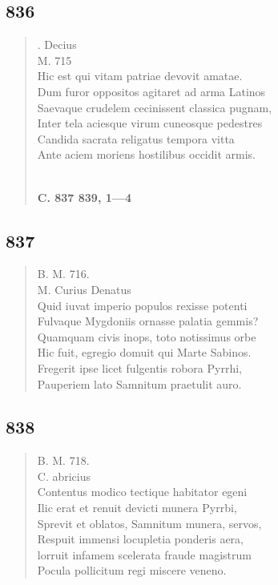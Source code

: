 \documentclass[11pt, a4paper]{report}
\begin{document}
            \subsection*{836}
      \begin{verse}
      . Decius \\ M. 715 \\ Hic est qui vitam patriae devovit amatae. \\ Dum furor oppositos agitaret ad arma Latinos \\ Saevaque crudelem cecinissent classica pugnam, \\ Inter tela aciesque virum cuneosque pedestres \\ Candida sacrata religatus tempora vitta \\ Ante aciem moriens hostilibus occidit armis. \\ 
        ﻿\pagebreak 
     \marginpar{[303]} \begin{center} \textbf{C. 837 839, 1—4} \end{center}
      \end{verse}
  
            \subsection*{837}
      \begin{verse}
      B. M. 716. \\ M. Curius Denatus \\ Quid iuvat imperio populos rexisse potenti \\ Fulvaque Mygdoniis ornasse palatia gemmis? \\ Quamquam civis inops, toto notissimus orbe \\ Hic fuit, egregio domuit qui Marte Sabinos. \\ Fregerit ipse licet fulgentis robora Pyrrhi, \\ Pauperiem lato Samnitum praetulit auro. \\ 
      \end{verse}
  
            \subsection*{838}
      \begin{verse}
      B. M. 718. \\ C. abricius \\ Contentus modico tectique habitator egeni \\ Ilic erat et renuit devicti munera Pyrrbi, \\ Sprevit et oblatos, Samnitum munera, servos, \\ Respuit immensi locupletia ponderis aera, \\ lorruit infamem scelerata fraude magistrum \\ Pocula pollicitum regi miscere veneno. \\ 
      \end{verse}
  
\end{document}
